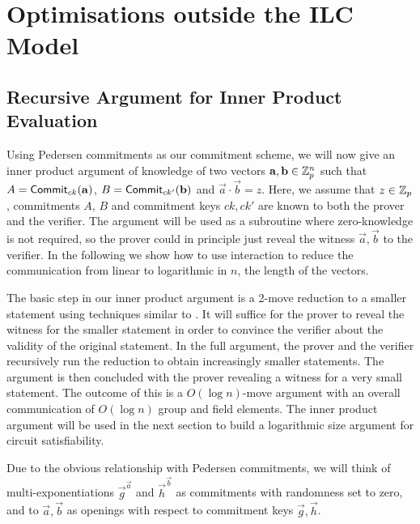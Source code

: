 \chapter{Optimisations outside the ILC Model}
\label{chapterlabel:Special-Optimisations}

\section{Recursive Argument for Inner Product Evaluation}\label{se:innerproduct}

Using Pedersen commitments as our commitment scheme, we will now give an inner product argument of knowledge of two vectors $\mathbf{a},\mathbf{b}\in \mathbb{Z}_p^n$ such that $A=\mathsf{Commit}_{ck}(\mathbf{a})$, $B=\mathsf{Commit}_{ck'}(\mathbf{b})$ and $\vec{a}\cdot \vec{b}=z$. Here, we assume that $z \in \mathbb{Z}_p$, commitments $A$, $B$ and commitment keys $ck,ck'$ are known to both the prover and the verifier. The argument will be used as a subroutine where zero-knowledge is not required, so the prover could in principle just reveal the witness $\vec{a},\vec{b}$ to the verifier. In the following we show how to use interaction to reduce the communication from linear to logarithmic in $n$, the length of the vectors.

The basic step in our inner product argument is a 2-move reduction to a smaller statement using techniques similar to \cite{BG12}. It will suffice for the prover to reveal the witness for the smaller statement in order to convince the verifier about the validity of the original statement.
In the full argument, the prover and the verifier recursively run the reduction to obtain increasingly smaller statements. The argument is then concluded with the prover revealing a %
witness for a very small statement.
The outcome of this is a $O(\log{n})$-move argument with an overall communication of $O(\log{n})$ group and field elements. The inner product argument will be used in the next section to build a logarithmic size argument for circuit satisfiability. 

Due to the obvious relationship with Pedersen commitments, we will think of multi-exponentiations $\vec{g}^{\vec{a}}$ and $\vec{h}^{\vec{b}}$ as commitments with randomness set to zero, and to $\vec{a},\vec{b}$ as openings with respect to commitment keys $\vec{g},\vec{h}$.


